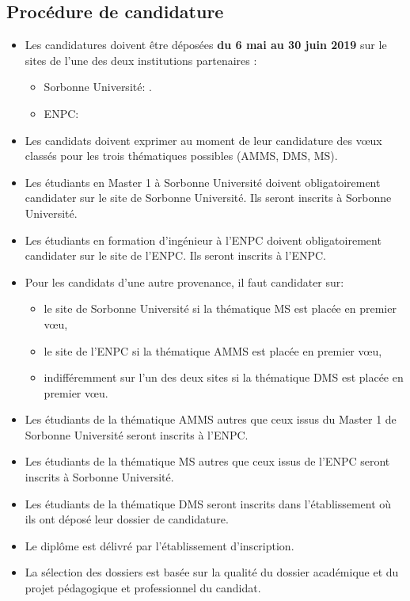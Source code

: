 \documentclass[french,11pt]{article}
\begin{document}
\subsection{Procédure de candidature}
%
%
\begin{itemize}
  \item
Les candidatures doivent être déposées \textbf{du 6 mai au 30 juin 2019} sur le sites de l'une des deux institutions partenaires :

\begin{itemize}
  \item Sorbonne Université: .
  \item ENPC: 
\end{itemize}


\item  Les candidats doivent exprimer au moment de leur candidature des vœux classés pour les trois thématiques possibles (AMMS, DMS, MS).
\item  Les étudiants en Master 1 à Sorbonne Université doivent obligatoirement candidater sur le site de Sorbonne Université. Ils seront inscrits à Sorbonne Université.
\item 
 Les étudiants en formation d’ingénieur à l’ENPC doivent obligatoirement candidater sur le site de l’ENPC. Ils seront inscrits à l'ENPC.
\item Pour les candidats d’une autre provenance, il faut candidater sur: 
  \begin{itemize}
    \item le site de Sorbonne Université si la thématique MS est placée en premier vœu,
    \item le site de l’ENPC si la thématique AMMS est placée en premier vœu,
    \item indifféremment sur l’un des deux sites si la thématique DMS est placée en premier vœu.
  \end{itemize}

\item 
Les étudiants de la thématique AMMS autres que ceux issus du Master 1 de Sorbonne Université seront inscrits à l'ENPC. 
\item
Les étudiants de la thématique MS autres que ceux issus de l'ENPC seront inscrits à Sorbonne Université.
\item
Les étudiants de la thématique DMS seront inscrits dans l'établissement où ils ont déposé leur dossier de candidature.
\item 
Le diplôme est délivré par l’établissement d’inscription.
\item
La sélection des dossiers est basée sur la qualité du dossier académique et du projet pédagogique et professionnel du candidat.


\end{itemize}
\end{document}
